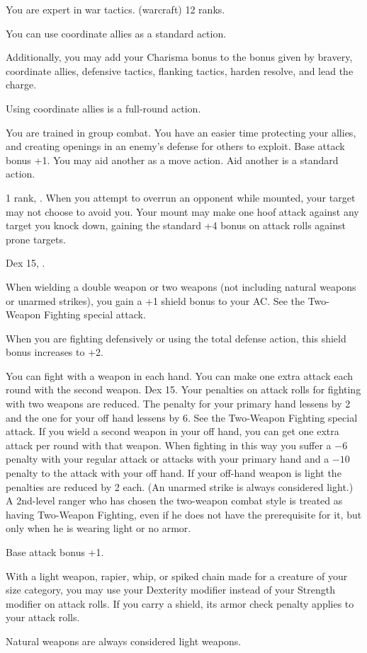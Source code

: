 {You are expert in war tactics.}
{ (warcraft) 12 ranks.}
{You can use coordinate allies as a standard action.

Additionally, you may add your Charisma bonus to the bonus given by bravery, coordinate allies, defensive tactics, flanking tactics, harden resolve, and lead the charge.
}
{Using coordinate allies is a full-round action.}{}

{You are trained in group combat. You have an easier time protecting your allies, and creating openings in an enemy's defense for others to exploit.}
{Base attack bonus +1.}
{You may aid another as a move action.}
{Aid another is a standard action.}{}

{ 1 rank, .}
{When you attempt to overrun an opponent while mounted, your target may not choose to avoid you. Your mount may make one hoof attack against any target you knock down, gaining the standard +4 bonus on attack rolls against prone targets.}

{Dex 15, .}
{When wielding a double weapon or two weapons (not including natural weapons or unarmed strikes), you gain a +1 shield bonus to your AC. See the Two-Weapon Fighting special attack.

When you are fighting defensively or using the total defense action, this shield bonus increases to +2.}

{You can fight with a weapon in each hand. You can make one extra attack each round with the second weapon.}
{Dex 15.}
{Your penalties on attack rolls for fighting with two weapons are reduced. The penalty for your primary hand lessens by 2 and the one for your off hand lessens by 6. See the Two-Weapon Fighting special attack.}
{If you wield a second weapon in your off hand, you can get one extra attack per round with that weapon. When fighting in this way you suffer a $-6$ penalty with your regular attack or attacks with your primary hand and a $-10$ penalty to the attack with your off hand. If your off-hand weapon is light the penalties are reduced by 2 each. (An unarmed strike is always considered light.)}
{A 2nd-level ranger who has chosen the two-weapon combat style is treated as having Two-Weapon Fighting, even if he does not have the prerequisite for it, but only when he is wearing light or no armor.}

{Base attack bonus +1.}
{With a light weapon, rapier, whip, or spiked chain made for a creature of your size category, you may use your Dexterity modifier instead of your Strength modifier on attack rolls. If you carry a shield, its armor check penalty applies to your attack rolls.

Natural weapons are always considered light weapons.}

